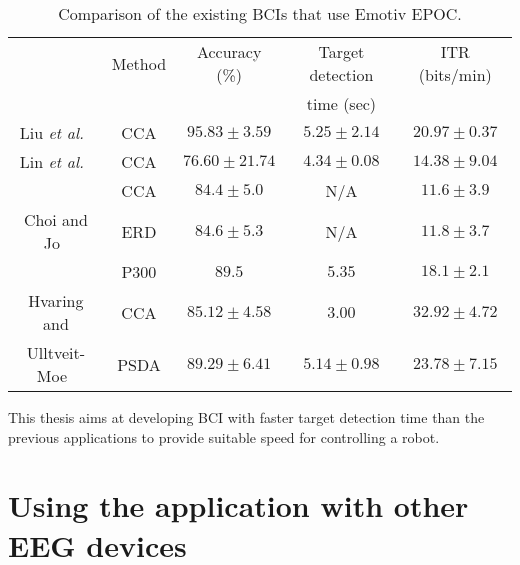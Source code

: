 \newcommand{\liu}{Liu \textit{et al.}~\cite{emotiv_11hz}}
\newcommand{\lin}{Lin \textit{et al.}~\cite{emotiv_walking}}
\newcommand{\choi}{Choi and Jo~\cite{emotiv_hybrid}}
\newcommand{\hvar}{Hvaring and}
\newcommand{\moe}{Ulltveit-Moe~\cite{emotiv_comparison}}
\newcommand{\duvi}{Duvinage \textit{et al.}~\cite{emotiv_p300_comp}}

\begin{table}[h]
	\centering
	\begin{tabular}{|c|c|c|c|c|}\hline
		& Method& Accuracy (\%)		& Target detection 	& ITR (bits/min)	\\
		&		&					& time (sec)		&					\\\hline
\liu	& CCA	& $95.83\pm 3.59$	& $5.25\pm 2.14$	& $20.97\pm 0.37$	\\\hline
\lin	& CCA	& $76.60\pm 21.74$	& $4.34\pm 0.08$	& $14.38\pm 9.04$	\\\hline
		& CCA	& $84.4\pm 5.0$		& N/A				& $11.6\pm 3.9$		\\\cline{2-5}
\choi	& ERD	& $84.6\pm 5.3$		& N/A				& $11.8\pm 3.7$		\\\cline{2-5}
		& P300	& $89.5$			& $5.35$			& $18.1\pm 2.1$		\\\hline
\hvar	& CCA	& $85.12\pm 4.58$	& $3.00$			& $32.92\pm 4.72$	\\\cline{2-5}
\moe	& PSDA	& $89.29\pm 6.41$	& $5.14\pm 0.98$	& $23.78\pm 7.15$	\\\hline
	\end{tabular}
	\caption{Comparison of the existing BCIs that use Emotiv EPOC.}
	\label{tab:emotiv_BCIs}
\end{table}

This thesis aims at developing \gls{BCI} with faster \gls{target} detection time than the previous applications to provide suitable speed for controlling a robot.

\section{Using the application with other EEG devices}
\label{sec:different_devices}

